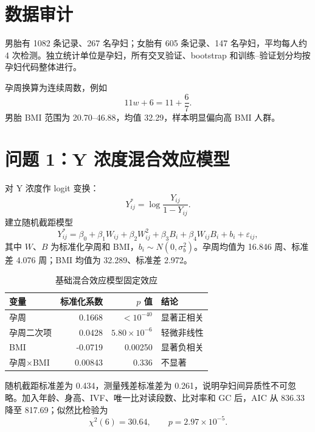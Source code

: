 \documentclass[UTF8,zihao=-4]{ctexart}
\begin{document}
\section{数据审计}

男胎有 1082 条记录、267 名孕妇；女胎有 605 条记录、147 名孕妇，平均每人约 4 次检测。独立统计单位是孕妇，所有交叉验证、bootstrap 和训练--验证划分均按孕妇代码整体进行。

孕周换算为连续周数，例如
\begin{equation}
11w+6=11+\frac{6}{7}.
\end{equation}
男胎 BMI 范围为 20.70--46.88，均值 32.29，样本明显偏向高 BMI 人群。

\section{问题 1：Y 浓度混合效应模型}

对 Y 浓度作 logit 变换：
\begin{equation}
Y^*_{ij}=\log\frac{Y_{ij}}{1-Y_{ij}}.
\end{equation}
建立随机截距模型
\begin{equation}
Y^*_{ij}=\beta_0+\beta_1W_{ij}+\beta_2W_{ij}^2
+\beta_3B_i+\beta_4W_{ij}B_i+b_i+\varepsilon_{ij},
\end{equation}
其中 $W$、$B$ 为标准化孕周和 BMI，$b_i\sim N(0,\sigma_b^2)$。孕周均值为 16.846 周、标准差 4.076 周；BMI 均值为 32.289、标准差 2.972。

\begin{table}[H]
\centering
\caption{基础混合效应模型固定效应}
\begin{tabular}{lrrl}
\toprule
变量 & 标准化系数 & $p$ 值 & 结论\\
\midrule
孕周 & 0.1668 & $<10^{-40}$ & 显著正相关\\
孕周二次项 & 0.0428 & $5.80\times10^{-6}$ & 轻微非线性\\
BMI & -0.0719 & 0.00250 & 显著负相关\\
孕周$\times$BMI & 0.00843 & 0.336 & 不显著\\
\bottomrule
\end{tabular}
\end{table}

随机截距标准差为 0.434，测量残差标准差为 0.261，说明孕妇间异质性不可忽略。加入年龄、身高、IVF、唯一比对读段数、比对率和 GC 后，AIC 从 836.33 降至 817.69；似然比检验为
\begin{equation}
\chi^2(6)=30.64,\qquad p=2.97\times10^{-5}.
\end{equation}
\end{document}
